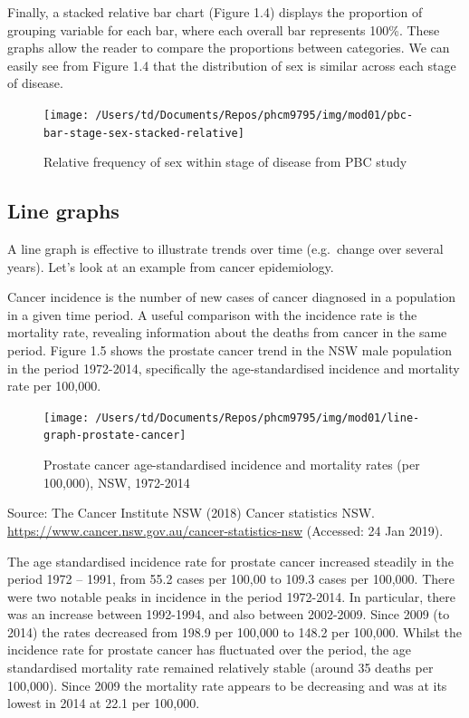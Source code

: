\documentclass[
]{memoir}
\begin{document}
Finally, a stacked relative bar chart (Figure 1.4) displays the proportion of grouping variable for each bar, where each overall bar represents 100\%. These graphs allow the reader to compare the proportions between categories. We can easily see from Figure 1.4 that the distribution of sex is similar across each stage of disease.

\begin{figure}
\texttt{[image: /Users/td/Documents/Repos/phcm9795/img/mod01/pbc-bar-stage-sex-stacked-relative]} \caption{Relative frequency of sex within stage of disease from PBC study}\label{fig:fig-1-4}
\end{figure}

\hypertarget{line-graphs}{%
\subsection{Line graphs}\label{line-graphs}}

A line graph is effective to illustrate trends over time (e.g.~change over several years). Let's look at an example from cancer epidemiology.

Cancer incidence is the number of new cases of cancer diagnosed in a population in a given time period. A useful comparison with the incidence rate is the mortality rate, revealing information about the deaths from cancer in the same period. Figure 1.5 shows the prostate cancer trend in the NSW male population in the period 1972-2014, specifically the age-standardised incidence and mortality rate per 100,000.

\begin{figure}
\texttt{[image: /Users/td/Documents/Repos/phcm9795/img/mod01/line-graph-prostate-cancer]} \caption{Prostate cancer age-standardised incidence and mortality rates (per 100,000), NSW, 1972-2014}\label{fig:fig-1-5}
\end{figure}

Source: The Cancer Institute NSW (2018) Cancer statistics NSW. \url{https://www.cancer.nsw.gov.au/cancer-statistics-nsw} (Accessed: 24 Jan 2019).

The age standardised incidence rate for prostate cancer increased steadily in the period 1972 -- 1991, from 55.2 cases per 100,00 to 109.3 cases per 100,000. There were two notable peaks in incidence in the period 1972-2014. In particular, there was an increase between 1992-1994, and also between 2002-2009. Since 2009 (to 2014) the rates decreased from 198.9 per 100,000 to 148.2 per 100,000. Whilst the incidence rate for prostate cancer has fluctuated over the period, the age standardised mortality rate remained relatively stable (around 35 deaths per 100,000). Since 2009 the mortality rate appears to be decreasing and was at its lowest in 2014 at 22.1 per 100,000.
\end{document}
